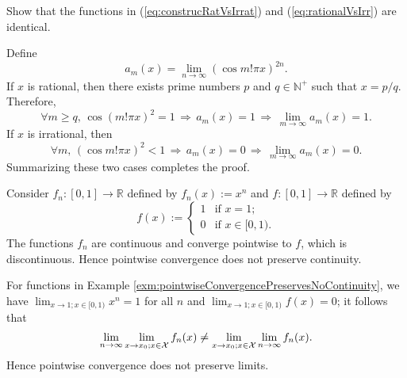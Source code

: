 \begin{exc}
  Show that the functions in (\ref{eq:construcRatVsIrrat})
  and (\ref{eq:rationalVsIrr}) are identical. 
\end{exc}
\begin{solution}
  Define
  \begin{equation*}
    a_m(x) = \lim_{n\rightarrow \infty}(\cos m!\pi x)^{{2n}}.
  \end{equation*}
  If $x$ is rational,
  then there exists prime numbers $p$ and $q\in \mathbb{N}^+$ such that
  $x = p/q$.
  Therefore,
  \begin{equation*}
    \forall m \ge q, \,
    \cos(m! \pi x)^2 = 1 \,
    \Rightarrow \,
    a_m(x) = 1 \,
    \Rightarrow \,
    \lim_{m\rightarrow \infty} a_m(x) = 1.
  \end{equation*}
  If $x$ is irrational,
  then
  \begin{equation*}
    \forall m, \,
    (\cos m!\pi x)^2 < 1 \,
    \Rightarrow \,
    a_m(x) = 0 \,
    \Rightarrow \,
    \lim_{m\rightarrow \infty} a_m(x) = 0.
  \end{equation*}
  Summarizing these two cases completes the proof.
\end{solution}

\begin{exm}
  \label{exm:pointwiseConvergencePreservesNoContinuity}
  Consider $f_n:[0,1]\rightarrow \mathbb{R}$
   defined by \mbox{$f_n(x) := x^n$}
   and $f:[0,1]\rightarrow \mathbb{R}$
   defined by 
   \begin{displaymath}
     f(x) :=
     \begin{cases}
       1 & \text{if } x=1;
       \\
       0 & \text{if } x\in [0,1).
     \end{cases}
   \end{displaymath}
  The functions $f_n$ are continuous
   and converge pointwise to $f$,
   which is discontinuous.
  Hence pointwise convergence
   does not preserve continuity.
\end{exm}

\begin{exm}
  \label{exm:pointwiseConvergencePreservesNoLimits}
  For functions
  in Example \ref{exm:pointwiseConvergencePreservesNoContinuity},
   we have \mbox{$\lim_{x\rightarrow 1; x\in [0,1)} x^n=1$} for all $n$
   and $\lim_{x\rightarrow 1; x\in [0,1)} f(x) =0$; 
   it follows that
   \begin{displaymath}
     \lim_{n\rightarrow\infty}\lim_{x\rightarrow x_0; x\in {\cal X}} f_n(x)
     \ne 
     \lim_{x\rightarrow x_0; x\in {\cal X}}\lim_{n\rightarrow\infty} f_n(x).
   \end{displaymath}
  Hence pointwise convergence does not preserve limits.
\end{exm}

